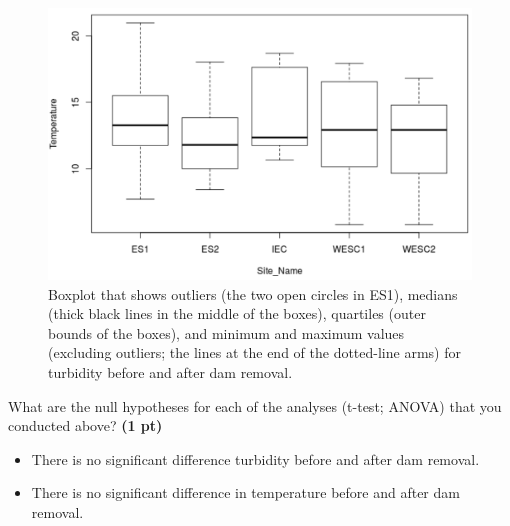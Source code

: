 \documentclass[12pt,letterpaper]{article}
\begin{document}
\begin{enumerate}[font=\bfseries, wide, resume]
    \begin{figure}[h]
        \centering
        \includegraphics[scale=0.25]{images/qst8.png}
        \caption{Boxplot that shows outliers (the two open circles in ES1), medians (thick black lines in the middle of the boxes), quartiles (outer bounds of the boxes), and minimum and maximum values (excluding outliers; the lines at the end of the dotted-line arms) for turbidity before and after dam removal.}
        \label{}
    \end{figure}

    {\color{gray}\item What are the null hypotheses for each of the analyses (t-test; ANOVA) that you conducted above? \textbf{(1 pt)}}\par
    \begin{itemize}
        \item There is no significant difference turbidity before and after dam removal.
        \item There is no significant difference in temperature before and after dam removal. 
    \end{itemize}
\end{enumerate}
\end{document}
